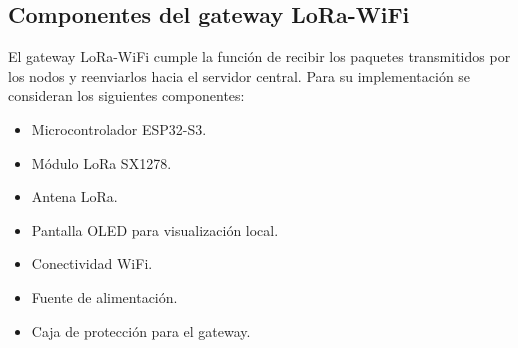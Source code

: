 \subsection{Componentes del gateway LoRa-WiFi}

El gateway LoRa-WiFi cumple la función de recibir los paquetes transmitidos por los nodos y reenviarlos hacia el servidor central. Para su implementación se consideran los siguientes componentes:

\begin{itemize}
    \item Microcontrolador ESP32-S3.
    \item Módulo LoRa SX1278.
    \item Antena LoRa.
    \item Pantalla OLED para visualización local.
    \item Conectividad WiFi.
    \item Fuente de alimentación.
    \item Caja de protección para el gateway.
\end{itemize}
\begingroup
\small
\renewcommand{\arraystretch}{1.2}
